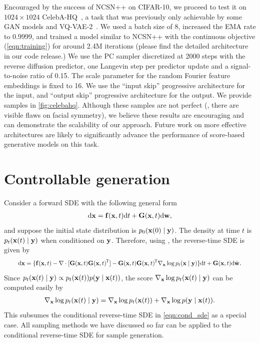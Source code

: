 Encouraged by the success of NCSN++ on CIFAR-10, we proceed to test it on $1024\times 1024$ CelebA-HQ~\citep{karras2018progressive}, a task that was previously only achievable by some GAN models and VQ-VAE-2~\citep{razavi2019generating}. We used a batch size of 8, increased the EMA rate to 0.9999, and trained a model similar to NCSN++ with the continuous objective (\cref{eqn:training}) for around 2.4M iterations (please find the detailed architecture in our code release.) We use the PC sampler discretized at 2000 steps with the reverse diffusion predictor, one Langevin step per predictor update and a signal-to-noise ratio of 0.15. The scale parameter for the random Fourier feature embeddings is fixed to 16. We use the ``input skip'' progressive architecture for the input, and ``output skip'' progressive architecture for the output. We provide samples in \cref{fig:celebahq}. Although these samples are not perfect (\eg, there are visible flaws on facial symmetry), we believe these results are encouraging and can demonstrate the scalability of our approach. Future work on more effective architectures are likely to significantly advance the performance of score-based generative models on this task.


\section{Controllable generation}\label{app:cond_gen}
Consider a forward SDE with the following general form
\begin{align*}
     \mathrm{d} \mathbf{x} = \mathbf{f}(\mathbf{x}, t) \mathrm{d} t + \mathbf{G}(\mathbf{x}, t) \mathrm{d} \mathbf{w},
\end{align*}
and suppose the initial state distribution is $p_0(\mathbf{x}(0) \mid \mathbf{y})$. The density at time $t$ is $p_t(\mathbf{x}(t) \mid \mathbf{y})$ when conditioned on $\mathbf{y}$. Therefore, using \citet{Anderson1982-ny}, the reverse-time SDE is given by
\begin{align}
\resizebox{0.92\linewidth}{!}{$\displaystyle \ud \bfx = \{\bff(\bfx, t) - \nabla \cdot [\bfG(\bfx, t) \bfG(\bfx,t)\tran] - \bfG(\bfx,t)\bfG(\bfx,t)\tran  \nabla_\bfx  \log p_t(\bfx \mid \bfy)\} \ud t + \mbf{G}(\bfx, t) \ud \bar{\bfw}$} \label{eqn:cond_sde_2}.
\end{align}
Since $p_t(\mathbf{x}(t) \mid \mathbf{y}) \propto p_t(\mathbf{x}(t)) p(\mathbf{y} \mid \mathbf{x}(t))$, the score $\nabla_{\mathbf{x}} \log p_t(\mathbf{x}(t) \mid \mathbf{y})$ can be computed easily by
\begin{align}
    \nabla_{\mathbf{x}} \log p_t(\mathbf{x}(t) \mid \mathbf{y}) = \nabla_{\mathbf{x}} \log p_t(\mathbf{x}(t)) + \nabla_{\mathbf{x}} \log p(\mathbf{y} \mid \mathbf{x}(t)).
\end{align}
This subsumes the conditional reverse-time SDE in \cref{eqn:cond_sde} as a special case. All sampling methods we have discussed so far can be applied to the conditional reverse-time SDE for sample generation.

